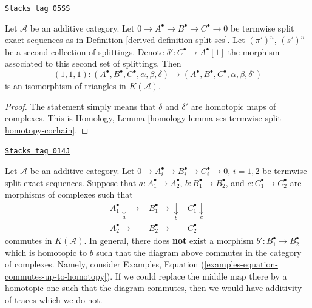 \begin{lemma}
\label{derived-lemma-triangle-independent-splittings}
\href{https://stacks.math.columbia.edu/tag/05SS}{\texttt{Stacks tag 05SS}}

Let $\mathcal{A}$ be an additive category. Let
$0 \to A^\bullet \to B^\bullet \to C^\bullet \to 0$
be termwise split exact sequences as in
Definition \ref{derived-definition-split-ses}.
Let $(\pi')^n$, $(s')^n$ be a second collection of splittings.
Denote $\delta' : C^\bullet \longrightarrow A^\bullet[1]$ the
morphism associated to this second set of splittings.
Then
$$
(1, 1, 1) :
(A^\bullet, B^\bullet, C^\bullet, \alpha, \beta, \delta)
\longrightarrow
(A^\bullet, B^\bullet, C^\bullet, \alpha, \beta, \delta')
$$
is an isomorphism of triangles in $K(\mathcal{A})$.
\end{lemma}

\begin{proof}
The statement simply means that $\delta$ and $\delta'$ are
homotopic maps of complexes. This is
Homology, Lemma \ref{homology-lemma-ses-termwise-split-homotopy-cochain}.
\end{proof}

\begin{remark}
\label{derived-remark-make-commute}
\href{https://stacks.math.columbia.edu/tag/014J}{\texttt{Stacks tag 014J}}

Let $\mathcal{A}$ be an additive category.
Let $0 \to A_i^\bullet \to B_i^\bullet \to C_i^\bullet \to 0$, $i = 1, 2$
be termwise split exact sequences. Suppose that
$a : A_1^\bullet \to A_2^\bullet$,
$b : B_1^\bullet \to B_2^\bullet$, and
$c : C_1^\bullet \to C_2^\bullet$ are morphisms of complexes
such that
$$
\begin{array}{ccc}A_1^\bullet \underset{a}{\downarrow}\longrightarrow & B_1^\bullet \longrightarrow\underset{b}{\downarrow} & C_1^\bullet \underset{c}{\downarrow} \\ A_2^\bullet \longrightarrow & B_2^\bullet \longrightarrow & C_2^\bullet\end{array}
$$
commutes in $K(\mathcal{A})$. In general, there does {\bf not} exist
a morphism $b' : B_1^\bullet \to B_2^\bullet$ which is homotopic to $b$
such that the diagram above commutes in the category of complexes.
Namely, consider
Examples, Equation (\ref{examples-equation-commutes-up-to-homotopy}).
If we could replace the middle map there by a homotopic one such that
the diagram commutes, then we would have additivity of traces which we do not.
\end{remark}

